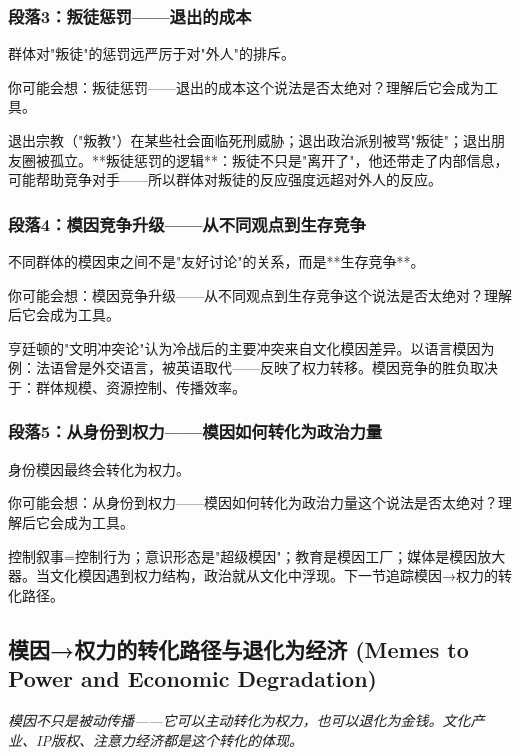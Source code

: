 \documentclass[a4paper,12pt]{book}
\newenvironment{motivation}{\begin{tcolorbox}[colback=gray!10,colframe=gray!60,title=\textit{本章动机},fonttitle=\bfseries,arc=0mm,leftrule=3mm]\small\itshape}{\end{tcolorbox}}
\begin{document}
\begin{motivation}
\begin{motivation}
\begin{motivation}
	\subsubsection*{段落3：叛徒惩罚——退出的成本}
	群体对"叛徒"的惩罚远严厉于对"外人"的排斥。
	\begin{tcolorbox}[colback=yellow!5, title=\textit{读者行为预测}]
		你可能会想：叛徒惩罚——退出的成本这个说法是否太绝对？理解后它会成为工具。
	\end{tcolorbox}

退出宗教（"叛教"）在某些社会面临死刑威胁；退出政治派别被骂"叛徒"；退出朋友圈被孤立。**叛徒惩罚的逻辑**：叛徒不只是"离开了"，他还带走了内部信息，可能帮助竞争对手——所以群体对叛徒的反应强度远超对外人的反应。

	\subsubsection*{段落4：模因竞争升级——从不同观点到生存竞争}
	不同群体的模因束之间不是"友好讨论"的关系，而是**生存竞争**。
	\begin{tcolorbox}[colback=yellow!5, title=\textit{读者行为预测}]
		你可能会想：模因竞争升级——从不同观点到生存竞争这个说法是否太绝对？理解后它会成为工具。
	\end{tcolorbox}

亨廷顿的"文明冲突论"认为冷战后的主要冲突来自文化模因差异。以语言模因为例：法语曾是外交语言，被英语取代——反映了权力转移。模因竞争的胜负取决于：群体规模、资源控制、传播效率。

	\subsubsection*{段落5：从身份到权力——模因如何转化为政治力量}
	身份模因最终会转化为权力。
	\begin{tcolorbox}[colback=yellow!5, title=\textit{读者行为预测}]
		你可能会想：从身份到权力——模因如何转化为政治力量这个说法是否太绝对？理解后它会成为工具。
	\end{tcolorbox}

控制叙事=控制行为；意识形态是"超级模因"；教育是模因工厂；媒体是模因放大器。当文化模因遇到权力结构，政治就从文化中浮现。下一节追踪模因→权力的转化路径。

	\subsection{模因→权力的转化路径与退化为经济 (Memes to Power and Economic Degradation)}
	\begin{motivation}
		模因不只是被动传播——它可以主动转化为权力，也可以退化为金钱。文化产业、IP版权、注意力经济都是这个转化的体现。
	\end{motivation}


\end{motivation}
\end{motivation}
\end{motivation}
\end{document}
